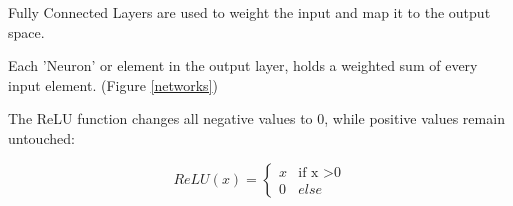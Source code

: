 Fully Connected Layers are used to weight the input and map it to the output space. 

Each 'Neuron' or element in the output layer, holds a weighted sum of every input element. (Figure \ref{networks})

The ReLU function changes all negative values to 0, while positive values remain untouched:

\begin{equation}
ReLU (x) = 
\begin{cases}
x & \text{if x >0} \\
0 & else
\end{cases}
\end{equation}


\pagebreak